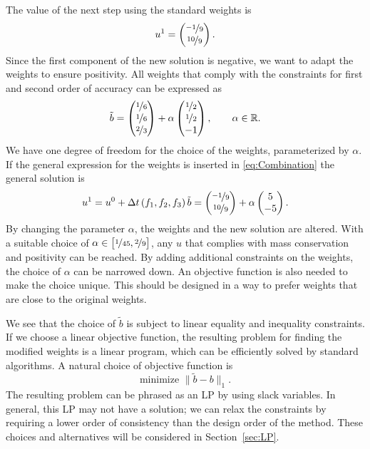 \documentclass[a4paper]{article}
\numberwithin{equation}{section}
\theoremstyle{plain}
\theoremstyle{definition}
\numberwithin{theorem}{section}
\newcommand{\R}{\mathbb{R}}
\newcommand{\dt}{{\Delta t}}
\newcommand{\1}{\mathbbm{1}}
\newcommand{\bt}{\tilde{b}}
\begin{document}
The value of the next step using the standard weights is
\begin{equation}
  u^1 = \begin{pmatrix} \nicefrac{-1}{9} \\ \nicefrac{10}{9} \end{pmatrix}.
\end{equation}
Since the first component of the new solution is negative,
we want to adapt the weights to ensure positivity.
All weights that comply with the constraints for first and second
order of accuracy can be expressed as
\begin{equation}
  \bt =
  \begin{pmatrix}
    \nicefrac{1}{6} \\
    \nicefrac{1}{6} \\
    \nicefrac{2}{3}
  \end{pmatrix}
  + \alpha \begin{pmatrix}
    \nicefrac{1}{2} \\
    \nicefrac{1}{2} \\
    -1
  \end{pmatrix},
  \qquad
  \alpha \in \R.
\end{equation}
We have one degree of freedom for the choice of the weights,
parameterized by $\alpha$.
If the general expression for the weights is inserted in
\eqref{eq:Combination} the general solution is
\begin{equation}
  u^{1}
  =
  u^0 + \dt \left(f_1, f_2, f_3\right) \bt
  =
  \begin{pmatrix}
    \nicefrac{-1}{9} \\
    \nicefrac{10}{9}
  \end{pmatrix}
  +\alpha \begin{pmatrix}
    5 \\
    -5
  \end{pmatrix}.
\end{equation}
By changing the parameter $\alpha$, the weights and the new
solution are altered. With a suitable choice of
$\alpha \in \left[ \nicefrac{1}{45}, \nicefrac{2}{9} \right]$,
any $u$ that complies with mass conservation and positivity can
be reached.
By adding additional constraints on the weights, the choice of
$\alpha$ can be narrowed down.
An objective function is also needed to make the choice unique. This should be
designed in a way to prefer weights that are close to the original weights.


We see that the choice of $\bt$ is subject to linear equality and inequality
constraints.  If we choose a linear objective function, the resulting problem
for finding the modified weights is a linear program, which can be efficiently
solved by standard algorithms.  A natural choice of objective function is
$$
\text{minimize } \|\bt - b\|_1.
$$
The resulting problem can be phrased as an LP by using slack variables.
In general, this LP may not have a solution; we can relax the constraints
by requiring a lower order of consistency than the design order of the
method.  These choices and alternatives will be considered in Section~\ref{sec:LP}.
\end{document}
